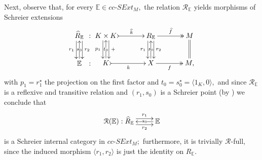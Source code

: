 \documentclass[a4paper]{amsart}
\theoremstyle{plain}
\theoremstyle{definition}
\theoremstyle{remark}
\newcommand{\rel}[1]{\mathcal{R}_{\mathbb{#1}}} %
\newcommand{\la}{\langle}
\newcommand{\ra}{\rangle}
\begin{document}
Next, observe that, for every $\mathbb{E}\in cc\text{-}SExt_M,$ the relation $\rel{E}$ yields morphisms of Schreier extensions
\begin{equation*}
\begin{aligned}
{
\xymatrixcolsep{0.1pc}
\xymatrix{
{\widehat{R}_{{\mathbb{E}}}} \ar@<.99ex>[d]^-{r_2} \ar@<-.99ex>[d]_-{r_1} &{:} \\
{\mathbb{E}} \ar[u]|-{s_0} &{:}
}
}
{
\xymatrixcolsep{3pc}
\xymatrix{
{K\times K} \ar@<.99ex>[d]^-{+} \ar@<-.99ex>[d]_-{p_1} \ar@{>->}[r]^-{\widehat{k}} &{R_{{\mathbb{E}}}}  \ar@<.99ex>[d]^-{r_2} \ar@<-.99ex>[d]_-{r_1} \ar@{->>}[r]^-{\widehat{f}} &{M} \ar@{=}[d] \\
{K} \ar[u]|-{t_0} \ar@{>->}[r]_-k &{X}\ar[u]|-{s_0}  \ar@{->>}[r]_-{f} &{M,}
}
}
\end{aligned}
\end{equation*}
with $p_1=r^\star_1$ the projection on the first factor and $t_0=s^\star_0=\la 1_K,0\ra,$ and since $\rel{E}$ is a reflexive and transitive relation and $(r_1,s_0)$ is a Schreier point (by \cite[Proposition 5.5]{AMR}) we conclude that
\begin{equation}
\label{eqn:R-eq}
\xymatrix{{\mathcal{R}(\mathbb{E}):\widehat{R}_{{\mathbb{E}}}} \ar@<.99ex>[r]^-{r_1} \ar@<-.99ex>[r]_-{r_2} &{\mathbb{E}} \ar[l]|-{s_0}}
\end{equation}
is a Schreier internal category in $cc\text{-}SExt_M;$ furthermore, it is trivially $\mathcal{R}$-full, since the induced morphism $\la r_1,r_2\ra$ is just the identity on $R_{\mathbb{E}}.$
\end{document}
